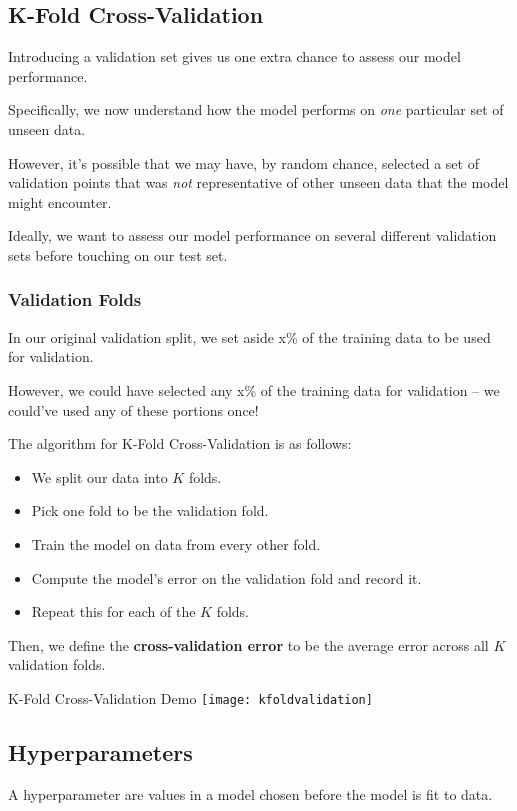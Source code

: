 \documentclass[openany]{book}
\begin{document}
\subsection{K-Fold Cross-Validation}
Introducing a validation set gives us one extra chance to assess our model performance.

Specifically, we now understand how the model performs on \textit{one} particular set of unseen data.

However, it's possible that we may have, by random chance, selected a set of validation points that was \textit{not} representative of other unseen data that the model might encounter.

Ideally, we want to assess our model performance on several different validation sets before touching on our test set.

\subsubsection{Validation Folds}
In our original validation split, we set aside x\% of the training data to be used for validation.

However, we could have selected any x\% of the training data for validation -- we could've used any of these portions once!

The algorithm for K-Fold Cross-Validation is as follows:
\begin{itemize}
	\item We split our data into $K$ folds.
	\item Pick one fold to be the validation fold.
	\item Train the model on data from every other fold.
	\item Compute the model's error on the validation fold and record it.
	\item Repeat this for each of the $K$ folds.
\end{itemize}

Then, we define the \textbf{cross-validation error} to be the average error across all $K$ validation folds.

\begin{figurebox}[]{K-Fold Cross-Validation Demo}
	\centering\texttt{[image: kfoldvalidation]}
\end{figurebox}

\subsection{Hyperparameters}
\begin{defn}[Hyperparameter]
	A hyperparameter are values in a model chosen before the model is fit to data.
\end{defn}
\end{document}

